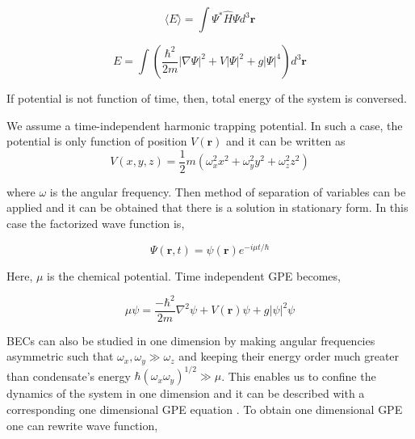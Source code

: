 \documentclass[a4paper,times,12pt]{article}
\begin{document}
\begin{equation}
\label{GPE_total_energy_general}
\langle E \rangle = \int \Psi^{*}\hat{H}\Psi d^3\boldsymbol{r}
\end{equation}

\begin{equation}
\label{GPE_total_energy}
E = \int \left(\frac {\hbar^2}{2m}|\nabla
\Psi|^2 + V|\Psi|^2 + g|\Psi|^4 \right) d^3\boldsymbol{r}
\end{equation}

\noindent If potential is not function of time, then, total energy of the system is conversed.

%

We assume a time-independent harmonic trapping potential. In such a case, the potential is only function of position $V(\boldsymbol{r})$ and it can be written as
\begin{equation}
\label{eq:GPE_harmonic_potential}
V(x, y, z) = \frac{1}{2}m(\omega_x^2 x^2 + \omega_y^2y^2 + \omega_z^2z^2)
\end{equation}


\noindent where $\omega$ is the angular frequency. Then method of separation of variables can be applied and it can be obtained that there is a solution in stationary form. In this case the factorized wave function is,

\begin{equation}
\label{eq:GPE_time_indep_wave_func}
\Psi(\boldsymbol{r}, t) = \psi(\boldsymbol{r})e^{-i\mu t/\hbar}
\end{equation}

\noindent Here, $\mu$ is the chemical potential. Time independent GPE becomes,

\begin{equation}
\label{eq:GPE_time_indep}
\mu\psi = \frac{-\hbar^2}{2m}\nabla^2\psi + V(\boldsymbol{r})\psi + g|\psi|^2\psi 
\end{equation}

BECs can also be studied in one dimension by making angular frequencies asymmetric such that $\omega_x, \omega_y \gg \omega_z$ and keeping their energy order much greater than condensate's energy $ \hbar(\omega_x \omega_y)^{1/2} \gg \mu $. This enables us to confine the dynamics of the system in one dimension and it can be described with a corresponding one dimensional GPE equation \cite{barenghi2016primer}. To obtain one dimensional GPE one can rewrite wave function,
\end{document}
